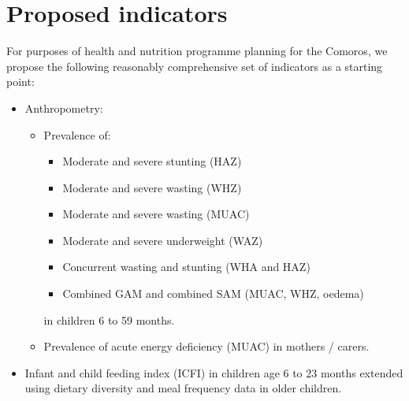 \documentclass[12pt,a4paper]{article}
\begin{document}
\hypertarget{proposed-indicators}{%
\section{Proposed indicators}\label{proposed-indicators}}

For purposes of health and nutrition programme planning for the Comoros, we propose the following reasonably comprehensive set of indicators as a starting point:

\begin{itemize}
\item
  Anthropometry:

  \begin{itemize}
  \item
    Prevalence of:

    \begin{itemize}
    \item
      Moderate and severe stunting (HAZ)
    \item
      Moderate and severe wasting (WHZ)
    \item
      Moderate and severe wasting (MUAC)
    \item
      Moderate and severe underweight (WAZ)
    \item
      Concurrent wasting and stunting (WHA and HAZ)
    \item
      Combined GAM and combined SAM (MUAC, WHZ, oedema)
    \end{itemize}

    in children 6 to 59 months.
  \item
    Prevalence of acute energy deficiency (MUAC) in mothers / carers.
  \end{itemize}
\item
  Infant and child feeding index (ICFI) in children age 6 to 23 months extended using dietary diversity and meal frequency data in older children.


\end{itemize}
\end{document}

